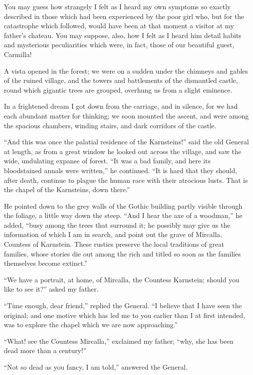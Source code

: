 \documentclass[11pt,twoside,makeidx,hidelinks,]{memoir}
\begin{document}
You may guess how strangely I felt as I heard my own symptoms so exactly
described in those which had been experienced by the poor girl who, but
for the catastrophe which followed, would have been at that moment a
visitor at my father's chateau. You may suppose, also, how I felt as I
heard him detail habits and mysterious peculiarities which were, in
fact, those of our beautiful guest, Carmilla!

A vista opened in the forest; we were on a sudden under the chimneys and
gables of the ruined village, and the towers and battlements of the
dismantled castle, round which gigantic trees are grouped, overhung us
from a slight eminence.

In a frightened dream I got down from the carriage, and in silence, for
we had each abundant matter for thinking; we soon mounted the ascent,
and were among the spacious chambers, winding stairs, and dark
corridors of the castle.

``And this was once the palatial residence of the Karnsteins!'' said the
old General at length, as from a great window he looked out across the
village, and saw the wide, undulating expanse of forest. ``It was a bad
family, and here its bloodstained annals were written,'' he continued.
``It is hard that they should, after death, continue to plague the human
race with their atrocious lusts. That is the chapel of the Karnsteins,
down there.''

He pointed down to the grey walls of the Gothic building partly visible
through the foliage, a little way down the steep. ``And I hear the axe of
a woodman,'' he added, ``busy among the trees that surround it; he
possibly may give us the information of which I am in search, and point
out the grave of Mircalla, Countess of Karnstein. These rustics preserve
the local traditions of great families, whose stories die out among the
rich and titled so soon as the families themselves become extinct.''

``We have a portrait, at home, of Mircalla, the Countess Karnstein;
should you like to see it?'' asked my father.

``Time enough, dear friend,'' replied the General. ``I believe that I have
seen the original; and one motive which has led me to you earlier than I
at first intended, was to explore the chapel which we are now
approaching.''

``What! see the Countess Mircalla,'' exclaimed my father; ``why, she has
been dead more than a century!''

``Not so dead as you fancy, I am told,'' answered the General.
\end{document}
